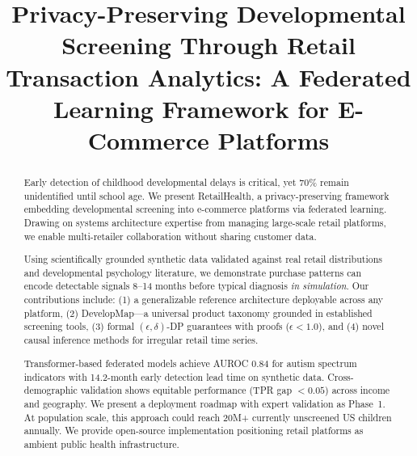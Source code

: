 \documentclass[conference]{IEEEtran}
\theoremstyle{plain}
\theoremstyle{remark}
\begin{document}
\title{Privacy-Preserving Developmental Screening Through Retail Transaction Analytics: A Federated Learning Framework for E-Commerce Platforms}

\author{



}




\maketitle


\begin{abstract}
\noindent
Early detection of childhood developmental delays is critical, yet 70\% remain unidentified until school age. We present RetailHealth, a privacy-preserving framework embedding developmental screening into e-commerce platforms via federated learning. Drawing on systems architecture expertise from managing large-scale retail platforms, we enable multi-retailer collaboration without sharing customer data.

Using scientifically grounded synthetic data validated against real retail distributions and developmental psychology literature, we demonstrate purchase patterns can encode detectable signals 8--14 months before typical diagnosis \emph{in simulation}. Our contributions include: (1) a generalizable reference architecture deployable across any platform, (2) DevelopMap---a universal product taxonomy grounded in established screening tools, (3) formal $(\epsilon,\delta)$-DP guarantees with proofs ($\epsilon<1.0$), and (4) novel causal inference methods for irregular retail time series.

Transformer-based federated models achieve AUROC 0.84 for autism spectrum indicators with 14.2-month early detection lead time on synthetic data. Cross-demographic validation shows equitable performance (TPR gap $<0.05$) across income and geography. We present a deployment roadmap with expert validation as Phase~1. At population scale, this approach could reach 20M+ currently unscreened US children annually. We provide open-source implementation positioning retail platforms as ambient public health infrastructure.
\end{abstract}
\end{document}
